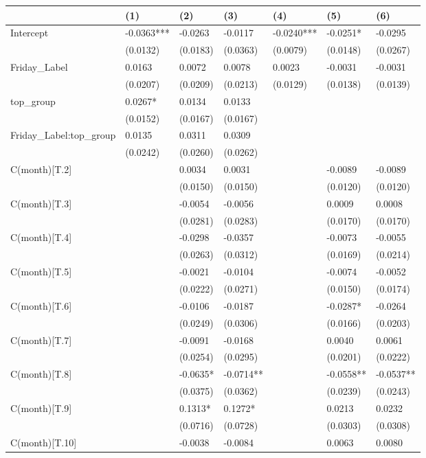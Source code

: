 \begin{tabular}{lllllll}
\toprule
 & (1) & (2) & (3) & (4) & (5) & (6) \\
\midrule
Intercept & -0.0363*** & -0.0263 & -0.0117 & -0.0240*** & -0.0251* & -0.0295 \\
 & (0.0132) & (0.0183) & (0.0363) & (0.0079) & (0.0148) & (0.0267) \\
Friday_Label & 0.0163 & 0.0072 & 0.0078 & 0.0023 & -0.0031 & -0.0031 \\
 & (0.0207) & (0.0209) & (0.0213) & (0.0129) & (0.0138) & (0.0139) \\
top_group & 0.0267* & 0.0134 & 0.0133 &  &  &  \\
 & (0.0152) & (0.0167) & (0.0167) &  &  &  \\
Friday_Label:top_group & 0.0135 & 0.0311 & 0.0309 &  &  &  \\
 & (0.0242) & (0.0260) & (0.0262) &  &  &  \\
C(month)[T.2] &  & 0.0034 & 0.0031 &  & -0.0089 & -0.0089 \\
 &  & (0.0150) & (0.0150) &  & (0.0120) & (0.0120) \\
C(month)[T.3] &  & -0.0054 & -0.0056 &  & 0.0009 & 0.0008 \\
 &  & (0.0281) & (0.0283) &  & (0.0170) & (0.0170) \\
C(month)[T.4] &  & -0.0298 & -0.0357 &  & -0.0073 & -0.0055 \\
 &  & (0.0263) & (0.0312) &  & (0.0169) & (0.0214) \\
C(month)[T.5] &  & -0.0021 & -0.0104 &  & -0.0074 & -0.0052 \\
 &  & (0.0222) & (0.0271) &  & (0.0150) & (0.0174) \\
C(month)[T.6] &  & -0.0106 & -0.0187 &  & -0.0287* & -0.0264 \\
 &  & (0.0249) & (0.0306) &  & (0.0166) & (0.0203) \\
C(month)[T.7] &  & -0.0091 & -0.0168 &  & 0.0040 & 0.0061 \\
 &  & (0.0254) & (0.0295) &  & (0.0201) & (0.0222) \\
C(month)[T.8] &  & -0.0635* & -0.0714** &  & -0.0558** & -0.0537** \\
 &  & (0.0375) & (0.0362) &  & (0.0239) & (0.0243) \\
C(month)[T.9] &  & 0.1313* & 0.1272* &  & 0.0213 & 0.0232 \\
 &  & (0.0716) & (0.0728) &  & (0.0303) & (0.0308) \\
C(month)[T.10] &  & -0.0038 & -0.0084 &  & 0.0063 & 0.0080 \\

\end{tabular}

